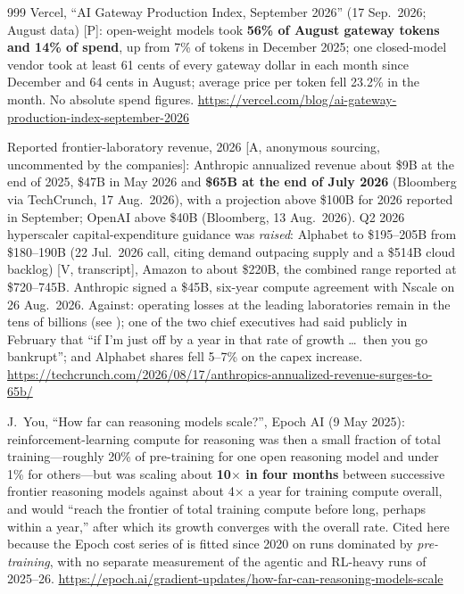 \begin{thebibliography}{999}
 Vercel, ``AI Gateway Production Index, September 2026'' (17 Sep.\ 2026; August data) [P]: open-weight models took \textbf{56\% of August gateway tokens and 14\% of spend}, up from 7\% of tokens in December 2025; one closed-model vendor took at least 61 cents of every gateway dollar in each month since December and 64 cents in August; average price per token fell 23.2\% in the month. No absolute spend figures. \url{https://vercel.com/blog/ai-gateway-production-index-september-2026}

 Reported frontier-laboratory revenue, 2026 [A, anonymous sourcing, uncommented by the companies]: Anthropic annualized revenue about \$9B at the end of 2025, \$47B in May 2026 and \textbf{\$65B at the end of July 2026} (Bloomberg via TechCrunch, 17 Aug.\ 2026), with a projection above \$100B for 2026 reported in September; OpenAI above \$40B (Bloomberg, 13 Aug.\ 2026). Q2 2026 hyperscaler capital-expenditure guidance was \emph{raised}: Alphabet to \$195--205B from \$180--190B (22 Jul.\ 2026 call, citing demand outpacing supply and a \$514B cloud backlog) [V, transcript], Amazon to about \$220B, the combined range reported at \$720--745B. Anthropic signed a \$45B, six-year compute agreement with Nscale on 26 Aug.\ 2026. Against: operating losses at the leading laboratories remain in the tens of billions (see \cite{openai-econ,openai-reset}); one of the two chief executives had said publicly in February that ``if I'm just off by a year in that rate of growth \ldots\ then you go bankrupt''; and Alphabet shares fell 5--7\% on the capex increase. \url{https://techcrunch.com/2026/08/17/anthropics-annualized-revenue-surges-to-65b/}

 J.~You, ``How far can reasoning models scale?'', Epoch AI (9 May 2025): reinforcement-learning compute for reasoning was then a small fraction of total training---roughly 20\% of pre-training for one open reasoning model and under 1\% for others---but was scaling about \textbf{10$\times$ in four months} between successive frontier reasoning models against about 4$\times$ a year for training compute overall, and would ``reach the frontier of total training compute before long, perhaps within a year,'' after which its growth converges with the overall rate. Cited here because the Epoch cost series of \cite{epoch-training-cost} is fitted since 2020 on runs dominated by \emph{pre-training}, with no separate measurement of the agentic and RL-heavy runs of 2025--26. \url{https://epoch.ai/gradient-updates/how-far-can-reasoning-models-scale}


\end{thebibliography}
